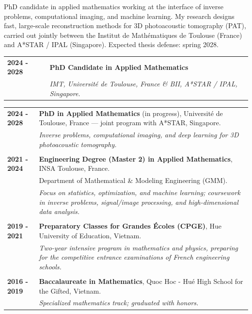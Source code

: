 \documentclass[a4paper,10pt]{article}
\begin{document}
\bigskip
\noindent
PhD candidate in applied mathematics working at the interface of inverse problems, computational imaging, and machine learning. My research designs fast, large-scale reconstruction methods for 3D photoacoustic tomography (PAT), carried out jointly between the Institut de Mathématiques de Toulouse (France) and A*STAR / IPAL (Singapore). Expected thesis defense: spring 2028.

\bigskip
\begin{tabular}{p{2.2cm}p{13.8cm}}
    {\bf 2024 - 2028} & {\bf PhD Candidate in Applied Mathematics} \\
    & \emph{IMT, Université de Toulouse, France \quad \& \quad BII, A*STAR / IPAL, Singapore.}
\end{tabular}

\begin{tabular}{p{2.2cm}p{13.8cm}}
    {\bf 2024 - 2028} & {\bf PhD in Applied Mathematics} (in progress), Université de Toulouse, France --- joint program with A*STAR, Singapore. \\
    & \emph{Inverse problems, computational imaging, and deep learning for 3D photoacoustic tomography.} \\
    \vspace{0.1cm}\\
    {\bf 2021 - 2024} & {\bf Engineering Degree (Master 2) in Applied Mathematics}, INSA Toulouse, France. \\
    & Department of Mathematical \& Modeling Engineering (GMM). \\
    & \emph{Focus on statistics, optimization, and machine learning; coursework in inverse problems, signal/image processing, and high-dimensional data analysis.} \\
    \vspace{0.1cm}\\
    {\bf 2019 - 2021} & {\bf Preparatory Classes for Grandes Écoles (CPGE)}, Hue University of Education, Vietnam. \\
    & \emph{Two-year intensive program in mathematics and physics, preparing for the competitive entrance examinations of French engineering schools.} \\
    \vspace{0.1cm}\\
    {\bf 2016 - 2019} & {\bf Baccalaureate in Mathematics}, Quoc Hoc - Hué High School for the Gifted, Vietnam. \\
    & \emph{Specialized mathematics track; graduated with honors.}
\end{tabular}
\end{document}
